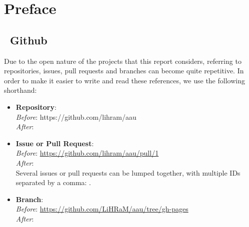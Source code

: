 \chapter*{Preface}


\section*{\faGithub~Github}
Due to the open nature of the projects that this report considers, referring to repositories, issues, pull requests and branches can become quite repetitive.
In order to make it easier to write and read these references, we use the following shorthand:
\begin{itemize}
    \item{
        \textbf{Repository}: \\
        \textit{Before}: https://github.com/lihram/aau\\
        \textit{After}: 
    }
    \item{
        \textbf{Issue or Pull Request}: \\
        \textit{Before}: \url{https://github.com/lihram/aau/pull/1}\\
        \textit{After}: \\
        Several issues or pull requests can be lumped together, with multiple IDs separated by a comma: .
    }
    \item{
        \textbf{Branch}: \\
        \textit{Before}: \url{https://github.com/LiHRaM/aau/tree/gh-pages}\\
        \textit{After}: 
    }
\end{itemize}